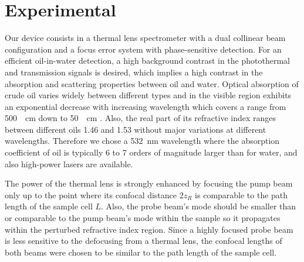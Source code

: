 \documentclass[9pt,twocolumn,twoside]{osajnl}
\begin{document}
\section{Experimental}
\label{Experimental}

Our device consists in a thermal lens spectrometer with a dual collinear beam configuration and a focus error system with phase-sensitive detection. For an efficient oil-in-water detection, a high background contrast in the photothermal and transmission signals is desired, which implies a high contrast in the absorption and scattering properties between oil and water. Optical absorption of crude oil varies widely between different types and in the visible region exhibits an exponential decrease with increasing wavelength which covers a range from \SI{500}{\per\centi\metre} down to \SI{50}{\per\centi\metre} \cite{OilCatalogue2005}. Also, the real part of its refractive index ranges between different oils \SI{1.46}{} and \SI{1.53}{} \cite{Otremba2000} without major variations at different wavelengths. Therefore we chose a \SI{532}{\nano\metre} wavelength where the absorption coefficient of oil is typically \SI{6}{} to \SI{7}{} orders of magnitude larger than for water, and also high-power lasers are available.

The power of the thermal lens is strongly enhanced by focusing the pump beam only up to the point where its confocal distance $2 z_R$ is comparable to the path length of the sample cell $L$. Also, the probe beam's mode should be smaller than or comparable to the pump beam's mode within the sample so it propagates within the perturbed refractive index region. Since a highly focused probe beam is less sensitive to the defocusing from a thermal lens, the confocal lengths of both beams were chosen to be similar to the path length of the sample cell.

\end{document}
